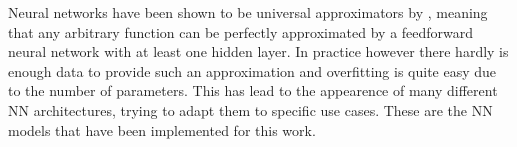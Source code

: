 Neural networks have been shown to be universal approximators by \cite{hornik_stinchcombe_white_1989}, meaning that any arbitrary function can be perfectly approximated by a feedforward neural network with at least one hidden layer. In practice however there hardly is enough data to provide such an approximation and overfitting is quite easy due to the number of parameters. This has lead to the appearence of many different NN architectures, trying to adapt them to specific use cases. These are the NN models that have been implemented for this work. 
\begin{itemize}



\end{itemize}
